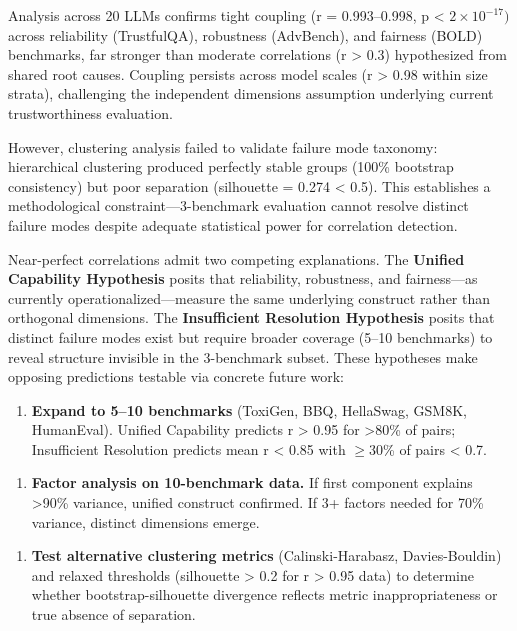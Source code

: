 
Analysis across 20 LLMs confirms tight coupling (r = 0.993--0.998, p < $2\times 10^{-17})$ across reliability (TrustfulQA), robustness (AdvBench), and fairness (BOLD) benchmarks, far stronger than moderate correlations (r > 0.3) hypothesized from shared root causes. Coupling persists across model scales (r > 0.98 within size strata), challenging the independent dimensions assumption underlying current trustworthiness evaluation.

However, clustering analysis failed to validate failure mode taxonomy: hierarchical clustering produced perfectly stable groups (100\% bootstrap consistency) but poor separation (silhouette = 0.274 < 0.5). This establishes a methodological constraint---3-benchmark evaluation cannot resolve distinct failure modes despite adequate statistical power for correlation detection.

Near-perfect correlations admit two competing explanations. The \textbf{Unified Capability Hypothesis} posits that reliability, robustness, and fairness---as currently operationalized---measure the same underlying construct rather than orthogonal dimensions. The \textbf{Insufficient Resolution Hypothesis} posits that distinct failure modes exist but require broader coverage (5--10 benchmarks) to reveal structure invisible in the 3-benchmark subset. These hypotheses make opposing predictions testable via concrete future work:

\begin{enumerate}
\item \textbf{Expand to 5--10 benchmarks} (ToxiGen, BBQ, HellaSwag, GSM8K, HumanEval). Unified Capability predicts r > 0.95 for >80\% of pairs; Insufficient Resolution predicts mean r < 0.85 with $\geq 30$\% of pairs < 0.7.
\end{enumerate}

\begin{enumerate}
\item \textbf{Factor analysis on 10-benchmark data.} If first component explains >90\% variance, unified construct confirmed. If 3+ factors needed for 70\% variance, distinct dimensions emerge.
\end{enumerate}

\begin{enumerate}
\item \textbf{Test alternative clustering metrics} (Calinski-Harabasz, Davies-Bouldin) and relaxed thresholds (silhouette > 0.2 for r > 0.95 data) to determine whether bootstrap-silhouette divergence reflects metric inappropriateness or true absence of separation.
\end{enumerate}

